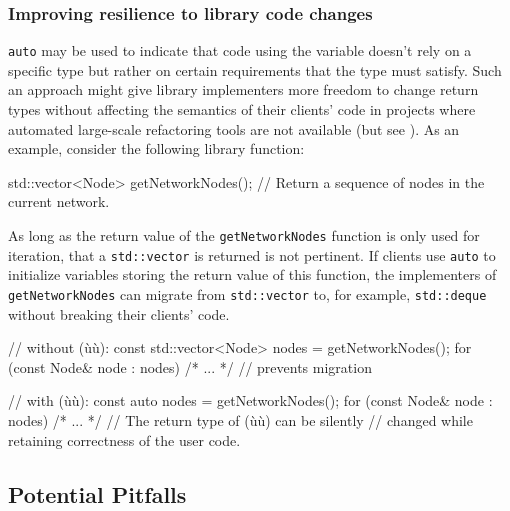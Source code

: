 \subsubsection[Improving resilience to library code changes]{Improving resilience to library code changes}\label{improving-resilience-to-library-code-changes}

\lstinline!auto! may be used to indicate that code using the variable
doesn't rely on a specific type but rather on certain requirements that
the type must satisfy. Such an approach might give library implementers
more freedom to change return types without affecting the semantics of
their clients' code in projects where automated large-scale refactoring
tools are not available (but see ). As an example,
consider the following library function:

\begin{emcppslisting}[language=C++]
std::vector<Node> getNetworkNodes();
    // Return a sequence of nodes in the current network.
\end{emcppslisting}
    
\noindent As long as the return value of the \lstinline!getNetworkNodes! function is
only used for iteration, that a \lstinline!std::vector! is
returned is not pertinent. If clients use \lstinline!auto! to initialize
variables storing the return value of this function, the implementers of
\lstinline!getNetworkNodes! can migrate from \lstinline!std::vector! to,
for example, \lstinline!std::deque! without breaking their clients'
code.

\begin{emcppslisting}[language=C++]
// without (ù{}ù):
const std::vector<Node> nodes = getNetworkNodes();
for (const Node& node : nodes) { /* ... */ }
    // prevents migration

// with (ù{}ù):
const auto nodes = getNetworkNodes();
for (const Node& node : nodes) { /* ... */ }
    // The return type of (ù{}ù) can be silently
    // changed while retaining correctness of the user code.
\end{emcppslisting}
    

\subsection[Potential Pitfalls]{Potential Pitfalls}\label{potential-pitfalls-auto}

